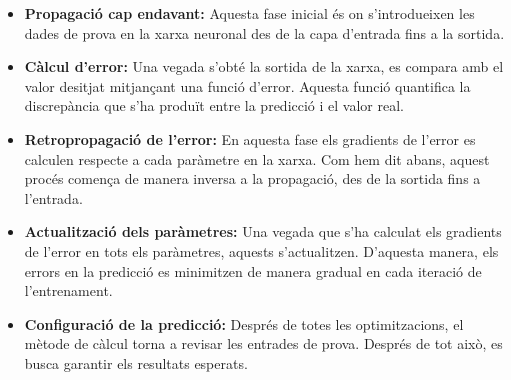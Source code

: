 \begin{itemize}

 \item \textbf{Propagació cap endavant:} Aquesta fase inicial és on s'introdueixen les dades de prova en la xarxa neuronal des de la capa d'entrada fins a la sortida.

 \item \textbf{Càlcul d'error:} Una vegada s'obté la sortida de la xarxa, es compara amb el valor desitjat mitjançant una funció d'error. Aquesta funció quantifica la discrepància que s'ha produït entre la predicció i el valor real.

 \item \textbf{Retropropagació de l'error:} En aquesta fase els gradients de l'error es calculen respecte a cada paràmetre en la xarxa. Com hem dit abans, aquest procés comença de manera inversa a la propagació, des de la sortida fins a l'entrada.

 \item \textbf{Actualització dels paràmetres:} Una vegada que s'ha calculat els gradients de l'error en tots els paràmetres, aquests s'actualitzen. D'aquesta manera, els errors en la predicció es minimitzen de manera gradual en cada iteració de l'entrenament.

 \item \textbf{Configuració de la predicció:} Després de totes les optimitzacions, el mètode de càlcul torna a revisar les entrades de prova. Després de tot això, es busca garantir els resultats esperats.
\end{itemize}
